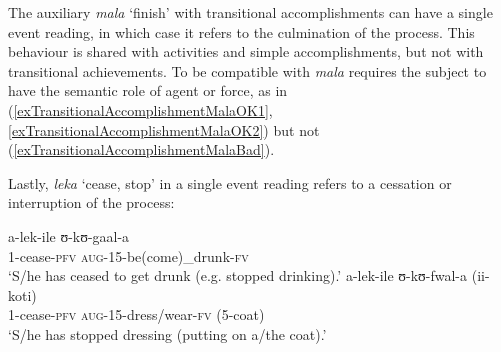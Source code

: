 The auxiliary \textit{mala} `finish' with transitional accomplishments can have a single event reading, in which case it refers to the culmination of the process. This behaviour is shared with activities and simple accomplishments, but not with transitional achievements. To be compatible with \textit{mala} requires the subject to have the semantic role of agent or force, as in (\ref{exTransitionalAccomplishmentMalaOK1}, \ref{exTransitionalAccomplishmentMalaOK2}) but not (\ref{exTransitionalAccomplishmentMalaBad}).
\begin{exe}
\ex\begin{xlist}
\end{xlist}
\end{exe}

Lastly, \textit{leka} \lq cease, stop' in a single event reading refers to a cessation or interruption of the process:
\begin{exe}
\ex \begin{xlist}
\ex \gll a-lek-ile ʊ-kʊ-gaal-a\\
1-cease-\textsc{pfv} \textsc{aug}-15-be(come)\_drunk-\textsc{fv}\\
\glt `S/he has ceased to get drunk (e.g. stopped drinking).'
\ex \gll a-lek-ile ʊ-kʊ-fwal-a \textup{(}ii-koti\textup{)}\\
1-cease-\textsc{pfv} \textsc{aug}-15-dress/wear-\textsc{fv} (5-coat)\\
\glt `S/he has stopped dressing (putting on a/the coat).'
\end{xlist}
\end{exe}
